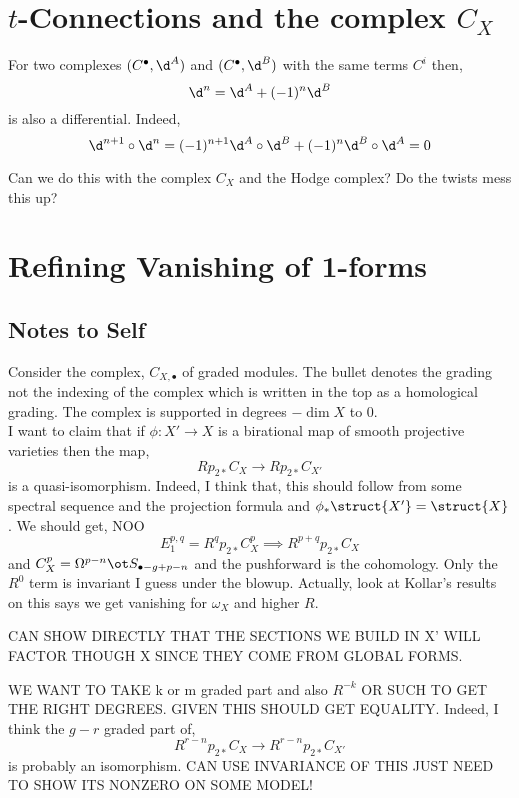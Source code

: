 \documentclass[12pt]{article}
\begin{document}
\section{$t$-Connections and the complex $C_X$}

For two complexes $(C^\bullet, \d^A)$ and $(C^\bullet, \d^B)$ with the same terms $C^i$ then,
\[ \d^n = \d^A + (-1)^n \d^B \]
is also a differential. Indeed,
\[ \d^{n+1} \circ \d^n = (-1)^{n+1} \d^A \circ \d^B + (-1)^{n} \d^B \circ \d^A = 0 \]

Can we do this with the complex $C_X$ and the Hodge complex? Do the twists mess this up?




\section{Refining Vanishing of 1-forms}

\subsection{Notes to Self}

Consider the complex, $C_{X, \bullet}$ of graded modules. The bullet denotes the grading not the indexing of the complex which is written in the top as a homological grading. The complex is supported in degrees $-\dim{X}$ to $0$.
\bigskip\\
I want to claim that if $\phi : X' \to X$ is a birational map of smooth projective varieties then the map,
\[ R p_{2 *} C_{X} \to R p_{2 *} C_{X'} \]
is a quasi-isomorphism. Indeed, I think that, this should follow from some spectral sequence and the projection formula and $\phi_* \struct{X'} = \struct{X}$. We should get, NOO
\[ E_1^{p,q} = R^q p_{2 *} C_X^p \implies R^{p+q} p_{2 *} C_X \]
and $C_X^p = \Omega^{p-n} \ot S_{\bullet - g + p - n}$ and the pushforward is the cohomology. Only the $R^0$ term is invariant I guess under the blowup. Actually, look at Kollar's results on this says we get vanishing for $\omega_X$ and higher $R$.

CAN SHOW DIRECTLY THAT THE SECTIONS WE BUILD IN X' WILL FACTOR THOUGH X SINCE THEY COME FROM GLOBAL FORMS.

WE WANT TO TAKE k or m graded part and also $R^{-k}$ OR SUCH TO GET THE RIGHT DEGREES. GIVEN THIS SHOULD GET EQUALITY. Indeed, I think the $g - r$ graded part of,
\[ R^{r-n} p_{2*} C_{X} \to R^{r-n} p_{2*} C_{X'} \]
is probably an isomorphism. CAN USE INVARIANCE OF THIS JUST NEED TO SHOW ITS NONZERO ON SOME MODEL!
\end{document}
